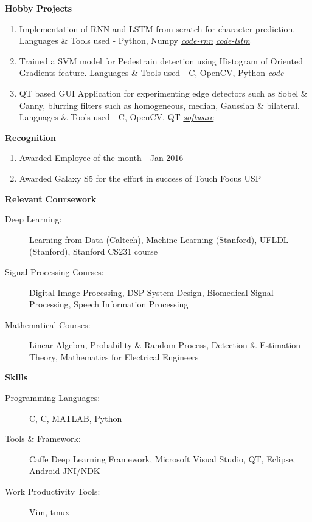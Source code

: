 \documentclass[letterpaper,11pt]{article}
\def\CC{{C\nolinebreak[4]\hspace{-.05em}\raisebox{.4ex}{\tiny\bf ++}}}
\newcommand{\resheading}[1]{{\large \colorbox{mygrey}{\begin{minipage}{\textwidth}{\textbf{#1 \vphantom{p\^{E}}}}\end{minipage}}}}
\begin{document}
\resheading{Hobby Projects}
\begin{enumerate}
	\item Implementation of RNN and LSTM from scratch for character prediction. Languages \& Tools used - Python, Numpy
		\faGithub \hspace{1mm}\href{https://github.com/nrupatunga/char-rnn}{\emph{code-rnn}}
		\faGithub \hspace{1mm}\href{https://github.com/nrupatunga/multi-layer-lstm}{\emph{code-lstm}}
	\item Trained a SVM model for Pedestrain detection using Histogram of Oriented Gradients feature. Languages \& Tools used - \CC, OpenCV, Python
		\faGithub \hspace{1mm}\href{https://github.com/nrupatunga/Pedestrain-Detection-using-Histogram-of-Oriented-Gradients}{\emph{code}}
	\item QT based GUI Application for experimenting edge detectors such as Sobel \& Canny, blurring filters such as homogeneous, median, Gaussian \& bilateral.
		Languages \& Tools used - \CC, OpenCV, QT
		\faWindows \hspace{1mm}\href{https://github.com/nrupatunga/Computer-Vision-Tool}{\emph{software}}
\end{enumerate}

\resheading{Recognition}
\begin{enumerate}
	\item Awarded Employee of the month - Jan 2016
	\item Awarded Galaxy S5 for the effort in success of Touch Focus USP
\end{enumerate}

\resheading{Relevant Coursework}
\begin{description}
	\item[Deep Learning:]
		Learning from Data (Caltech), Machine Learning (Stanford), UFLDL (Stanford), Stanford CS231 course
	\item[Signal Processing Courses:]
		Digital Image Processing, DSP System Design, Biomedical Signal Processing, Speech Information Processing
	\item[Mathematical Courses:]
		Linear Algebra, Probability \& Random Process, Detection \& Estimation Theory, Mathematics for Electrical Engineers
\end{description}

\resheading{Skills}
\begin{description}
	\item[Programming Languages:]
		C, \CC, MATLAB, Python
	\item[Tools \& Framework:]
		Caffe Deep Learning Framework, Microsoft Visual Studio, QT, Eclipse, Android JNI/NDK
	\item[Work Productivity Tools:] Vim, tmux
\end{description}
\end{document}
